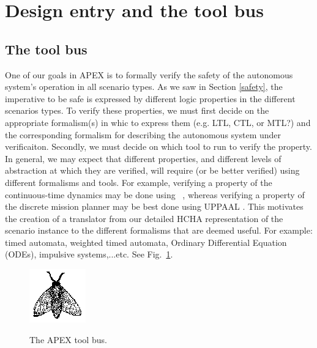 \section{Design entry and the tool bus}
\label{designEntryAndToolBus}

\subsection{The tool bus}
\label{tool bus}
One of our goals in APEX is to formally verify the safety of the autonomous system's operation in all scenario types.
As we saw in Section \ref{safety}, the imperative to be safe is expressed by different logic properties in the different scenarios types.
To verify these properties, we must first decide on the appropriate formalism(s) in whic to express them (e.g. LTL, CTL, or MTL?) 
and the corresponding formalism for describing the autonomous system under verificaiton.
Secondly, we must decide on which tool to run to verify the property.
In general, we may expect that different properties, and different levels of abstraction at which they are verified, will require (or be better verified) using different formalisms and tools. 
For example, verifying a property of the continuous-time dynamics may be done using {\staliro}~\cite{AnnapureddyLFS11tacas},
whereas verifying a property of the discrete mission planner may be best done using UPPAAL \cite{BehrmannDLHPYH06qest}.
This motivates the creation of a translator from our detailed HCHA representation of the scenario instance to the different formalisms that are deemed useful. 
For example: timed automata, weighted timed automata, Ordinary Differential Equation (ODEs), impulsive systems,...etc.
See Fig.~\ref{fig:toolbus}.

\begin{figure}[tb]
	\centering
		\includegraphics{figures/fly.eps}
	\label{fig:toolbus}
	\caption{The APEX tool bus.}
\end{figure}


